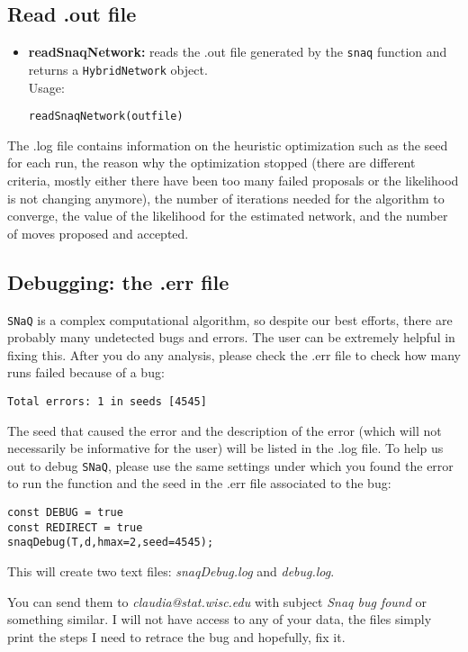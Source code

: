 \documentclass[12pt]{article}
\begin{document}
\subsection{Read .out file}
\begin{itemize}
\item \textbf{readSnaqNetwork:} reads the .out file generated by the
  \texttt{snaq} function and returns a \texttt{HybridNetwork}
  object.\\
Usage:
\begin{lstlisting}
readSnaqNetwork(outfile)
\end{lstlisting}
\end{itemize}

The .log file contains information on the heuristic optimization
such as the seed for each run, the reason why the optimization stopped
(there are different criteria, mostly either there have been too many
failed proposals or the likelihood is not changing anymore), the
number of iterations needed for the algorithm to converge, the value
of the likelihood for the estimated network, and the
number of moves proposed and accepted.


\subsection{Debugging: the .err file}
\texttt{SNaQ} is a complex computational algorithm, so despite our
best efforts, there are probably many undetected bugs and errors. The
user can be extremely helpful in fixing this.
After you do any analysis, please check the .err file to check how
many runs failed because of a bug:
\begin{lstlisting}
Total errors: 1 in seeds [4545]
\end{lstlisting}

The seed that caused the error and
the description of the error (which will not necessarily be
informative for the user) will be listed in the .log file.
To help us out to debug \texttt{SNaQ}, please use the same settings
under which you found the error to run the function and the seed in
the .err file associated to the bug:
\begin{lstlisting}
const DEBUG = true
const REDIRECT = true
snaqDebug(T,d,hmax=2,seed=4545);
\end{lstlisting}
This will create two text files: \textit{snaqDebug.log} and
\textit{debug.log}.

You can send them to
\textit{claudia@stat.wisc.edu} with subject \textit{Snaq bug found} or
something similar. I
will not have access to any of your data, the files simply print the
steps I need to retrace the bug and hopefully, fix it.
\end{document}

